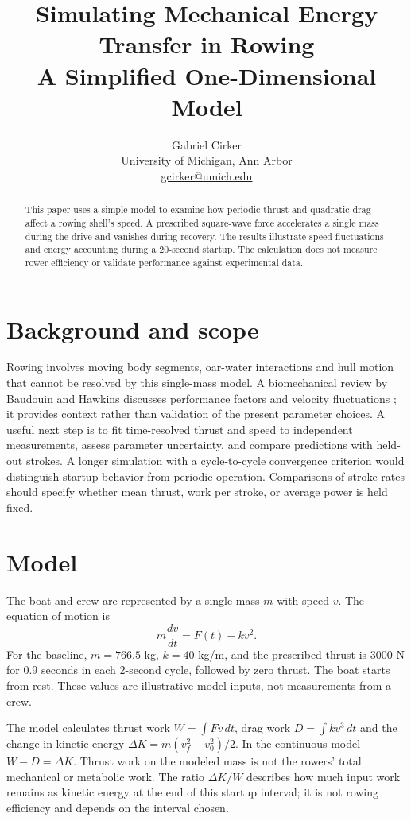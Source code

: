 \documentclass[11pt]{article}
\title{Simulating Mechanical Energy Transfer in Rowing\\\large A Simplified One-Dimensional Model}
\author{Gabriel Cirker\\\small University of Michigan, Ann Arbor\\\small \href{mailto:gcirker@umich.edu}{gcirker@umich.edu}}
\date{}
\begin{document}
\maketitle
\begin{abstract}
This paper uses a simple model to examine how periodic thrust and quadratic drag affect a rowing shell's speed. A prescribed square-wave force accelerates a single mass during the drive and vanishes during recovery. The results illustrate speed fluctuations and energy accounting during a 20-second startup. The calculation does not measure rower efficiency or validate performance against experimental data.
\end{abstract}
\section{Background and scope}
Rowing involves moving body segments, oar-water interactions and hull motion that cannot be resolved by this single-mass model. A biomechanical review by Baudouin and Hawkins discusses performance factors and velocity fluctuations \cite{baudouin}; it provides context rather than validation of the present parameter choices. A useful next step is to fit time-resolved thrust and speed to independent measurements, assess parameter uncertainty, and compare predictions with held-out strokes. A longer simulation with a cycle-to-cycle convergence criterion would distinguish startup behavior from periodic operation. Comparisons of stroke rates should specify whether mean thrust, work per stroke, or average power is held fixed.
\section{Model}
The boat and crew are represented by a single mass $m$ with speed $v$. The equation of motion is
\begin{equation}m\frac{dv}{dt}=F(t)-kv^2.\end{equation}
For the baseline, $m=766.5$ kg, $k=40$ kg/m, and the prescribed thrust is 3000 N for 0.9 seconds in each 2-second cycle, followed by zero thrust. The boat starts from rest. These values are illustrative model inputs, not measurements from a crew.

The model calculates thrust work $W=\int Fv\,dt$, drag work $D=\int kv^3\,dt$ and the change in kinetic energy $\Delta K=m(v_f^2-v_0^2)/2$. In the continuous model $W-D=\Delta K$. Thrust work on the modeled mass is not the rowers' total mechanical or metabolic work. The ratio $\Delta K/W$ describes how much input work remains as kinetic energy at the end of this startup interval; it is not rowing efficiency and depends on the interval chosen.
\end{document}

